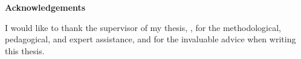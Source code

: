 \textbf{Acknowledgements}

I would like to thank the supervisor of my \MakeLowercase{\thesistype} thesis, \thesissupervisor, for the methodological, pedagogical, and expert assistance, and for the invaluable advice when writing this thesis.
